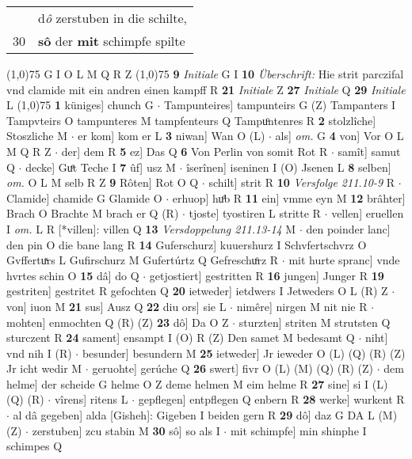 \documentclass[8pt,a4paper,notitlepage]{article}
\begin{document}
\begin{table}[ht]
\begin{minipage}[t]{0.5\linewidth}
\begin{tabular}{rl}
 & d\textit{ô} zerstuben in die schilte,\\ 
30 & \textbf{sô} der \textbf{mit} schimpfe spilte\\ 
\end{tabular}
\scriptsize
\line(1,0){75} \newline
G I O L M Q R Z \newline
\line(1,0){75} \newline
\textbf{9} \textit{Initiale} G I  \textbf{10} \textit{Überschrift:} Hie strit parczifal vnd clamide mit ein andren einen kampff R  \textbf{21} \textit{Initiale} Z  \textbf{27} \textit{Initiale} Q  \textbf{29} \textit{Initiale} L  \newline
\line(1,0){75} \newline
\textbf{1} küniges] chunch G  $\cdot$ Tampunteires] tampunteirs G (Z) Tampanters I Tampvteirs O tampunteres M tampfenteurs Q Tampuͦntenres R \textbf{2} stolzlîche] Stoszliche M  $\cdot$ er kom] kom er L \textbf{3} niwan] Wan O (L)  $\cdot$ als] \textit{om.} G \textbf{4} von] Vor O L M Q R Z  $\cdot$ der] dem R \textbf{5} ez] Das Q \textbf{6} Von Perlin von somit Rot R  $\cdot$ samît] samut Q  $\cdot$ decke] Guͤt Teche I \textbf{7} ûf] usz M  $\cdot$ îserînen] iseninen I (O) Jsenen L \textbf{8} selben] \textit{om.} O L M selb R Z \textbf{9} Rôten] Rot O Q  $\cdot$ schilt] strit R \textbf{10} \textit{Versfolge 211.10-9} R   $\cdot$ Clamide] chamide G Glamide O  $\cdot$ erhuop] huͦb R \textbf{11} ein] vmme eyn M \textbf{12} brâhter] Brach O Brachte M brach er Q (R)  $\cdot$ tjoste] tyostiren L stritte R  $\cdot$ vellen] eruellen I \textit{om.} L R [*villen]: villen Q \textbf{13} \textit{Versdoppelung 211.13-14} M   $\cdot$ den poinder lanc] den pin O die bane lang R \textbf{14} Guferschurz] kuuershurz I Schvfertschvrz O Gvffertuͯrs L Gufirschurz M Gufertúrtz Q Gefreschuͦrz R  $\cdot$ mit hurte spranc] vnde hvrtes schin O \textbf{15} dâ] do Q  $\cdot$ getjostiert] gestritten R \textbf{16} jungen] Junger R \textbf{19} gestriten] gestritet R gefochten Q \textbf{20} ietweder] ietdwers I Jetweders O L (R) Z  $\cdot$ von] iuon M \textbf{21} sus] Ausz Q \textbf{22} diu ors] sie L  $\cdot$ nimêre] nirgen M nit nie R  $\cdot$ mohten] enmochten Q (R) (Z) \textbf{23} dô] Da O Z  $\cdot$ sturzten] striten M strutsten Q sturczent R \textbf{24} sament] ensampt I (O) R (Z) Den samet M bedesamt Q  $\cdot$ niht] vnd nih I (R)  $\cdot$ besunder] besundern M \textbf{25} ietweder] Jr ieweder O (L) (Q) (R) (Z) Jr icht wedir M  $\cdot$ geruohte] gerúche Q \textbf{26} swert] fivr O (L) (M) (Q) (R) (Z)  $\cdot$ dem helme] der scheide G helme O Z deme helmen M eim helme R \textbf{27} sine] si I (L) (Q) (R)  $\cdot$ vîrens] ritens L  $\cdot$ gepflegen] entpflegen Q enbern R \textbf{28} werke] wurkent R  $\cdot$ al dâ gegeben] alda [Gisheh]: Gigeben I beiden gern R \textbf{29} dô] daz G DA L (M) (Z)  $\cdot$ zerstuben] zcu stabin M \textbf{30} sô] so als I  $\cdot$ mit schimpfe] min shinphe I schimpes Q \newline

\end{minipage}
\end{table}
\end{document}
